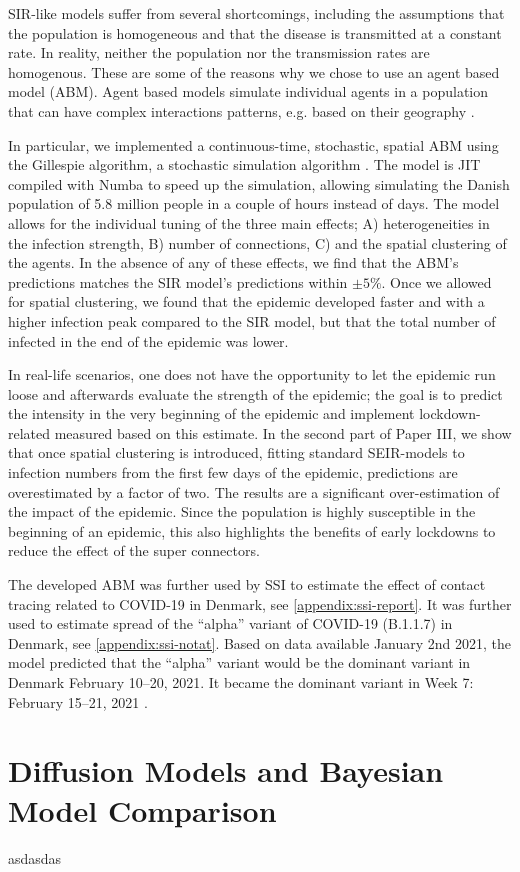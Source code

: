 SIR-like models suffer from several shortcomings, including the assumptions that the population is homogeneous and that the disease is transmitted at a constant rate. In reality, neither the population nor the transmission rates are homogenous. These are some of the reasons why we chose to use an agent based model (ABM). Agent based models simulate individual agents in a population that can have complex interactions patterns, e.g. based on their geography \parencite{wilenskyIntroductionAgentBasedModeling2015}.

In particular, we implemented a continuous-time, stochastic, spatial ABM using the Gillespie algorithm, a stochastic simulation algorithm \autocite{gillespieExactStochasticSimulation1977}. The model is JIT compiled with Numba \autocite{lamNumbaLLVMbasedPython2015} to speed up the simulation, allowing simulating the Danish population of 5.8 million people in a couple of hours instead of days. The model allows for the individual tuning of the three main effects; A) heterogeneities in the infection strength, B) number of connections, C) and the spatial clustering of the agents. In the absence of any of these effects, we find that the ABM's predictions matches the SIR model's predictions within $\pm 5 \%$. Once we allowed for spatial clustering, we found that the epidemic developed faster and with a higher infection peak compared to the SIR model, but that the total number of infected in the end of the epidemic was lower.

In real-life scenarios, one does not have the opportunity to let the epidemic run loose and afterwards evaluate the strength of the epidemic; the goal is to predict the intensity in the very beginning of the epidemic and implement lockdown-related measured based on this estimate. In the second part of Paper III, we show that once spatial clustering is introduced, fitting standard SEIR-models to infection numbers from the first few days of the epidemic, predictions are overestimated by a factor of two. The results are a significant over-estimation of the impact of the epidemic. Since the population is highly susceptible in the beginning of an epidemic, this also highlights the benefits of early lockdowns to reduce the effect of the super connectors.

The developed ABM was further used by SSI to estimate the effect of contact tracing related to COVID-19 in Denmark, see \autoref{appendix:ssi-report}. It was further used to estimate spread of the ``alpha'' variant of COVID-19 (B.1.1.7) in Denmark, see \autoref{appendix:ssi-notat}. Based on data available January 2nd 2021, the model predicted that the ``alpha'' variant would be the dominant variant in Denmark February 10--20, 2021. It became the dominant variant in Week 7: February 15--21, 2021 \autocite{bagerRiskHospitalisationAssociated2021}.

\section{Diffusion Models and Bayesian Model Comparison}
\label{section:diffusion}
asdasdas
